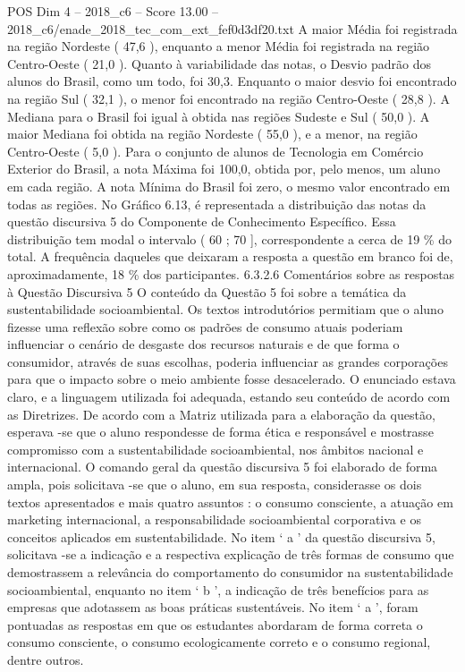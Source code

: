 \begin{textsample}{POS Dim 4 – 2018\_c6 – Score 13.00 – 2018\_c6/enade\_2018\_tec\_com\_ext\_fef0d3df20.txt}
A maior Média foi registrada na região Nordeste ( 47,6 ), enquanto a menor Média foi registrada na região Centro-Oeste ( 21,0 ).
Quanto à variabilidade das notas, o Desvio padrão dos alunos do Brasil, como um todo, foi 30,3.
Enquanto o maior desvio foi encontrado na região Sul ( 32,1 ), o menor foi encontrado na região Centro-Oeste ( 28,8 ).
A Mediana para o Brasil foi igual à obtida nas regiões Sudeste e Sul ( 50,0 ).
A maior Mediana foi obtida na região Nordeste ( 55,0 ), e a menor, na região Centro-Oeste ( 5,0 ).
Para o conjunto de alunos de Tecnologia em Comércio Exterior do Brasil, a nota Máxima foi 100,0, obtida por, pelo menos, um aluno em cada região.
A nota Mínima do Brasil foi zero, o mesmo valor encontrado em todas as regiões.
No Gráfico 6.13, é representada a distribuição das notas da questão discursiva 5 do Componente de Conhecimento Específico.
Essa distribuição tem modal o intervalo ( 60 ; 70 ], correspondente a cerca de 19 \% do total.
A frequência daqueles que deixaram a resposta a questão em branco foi de, aproximadamente, 18 \% dos participantes. 6.3.2.6 Comentários sobre as respostas à Questão Discursiva 5 O conteúdo da Questão 5 foi sobre a temática da sustentabilidade socioambiental.
Os textos introdutórios permitiam que o aluno fizesse uma reflexão sobre como os padrões de consumo atuais poderiam influenciar o cenário de desgaste dos recursos naturais e de que forma o consumidor, através de suas escolhas, poderia influenciar as grandes corporações para que o impacto sobre o meio ambiente fosse desacelerado.
O enunciado estava claro, e a linguagem utilizada foi adequada, estando seu conteúdo de acordo com as Diretrizes.
De acordo com a Matriz utilizada para a elaboração da questão, esperava -se que o aluno respondesse de forma ética e responsável e mostrasse compromisso com a sustentabilidade socioambiental, nos âmbitos nacional e internacional.
O comando geral da questão discursiva 5 foi elaborado de forma ampla, pois solicitava -se que o aluno, em sua resposta, considerasse os dois textos apresentados e mais quatro assuntos : o consumo consciente, a atuação em marketing internacional, a responsabilidade socioambiental corporativa e os conceitos aplicados em sustentabilidade.
No item ‘ a ’ da questão discursiva 5, solicitava -se a indicação e a respectiva explicação de três formas de consumo que demostrassem a relevância do comportamento do consumidor na sustentabilidade socioambiental, enquanto no item ‘ b ’, a indicação de três benefícios para as empresas que adotassem as boas práticas sustentáveis.
No item ‘ a ’, foram pontuadas as respostas em que os estudantes abordaram de forma correta o consumo consciente, o consumo ecologicamente correto e o consumo regional, dentre outros.

\end{textsample}
